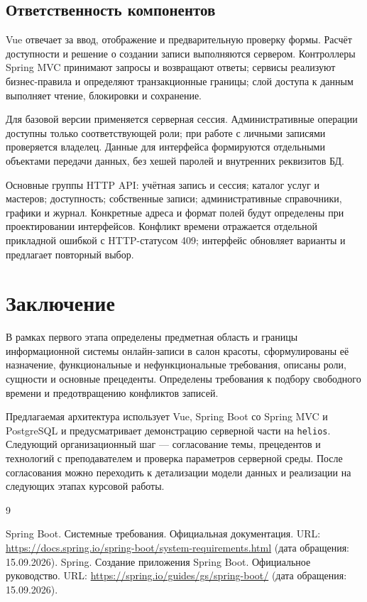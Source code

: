 \subsection{Ответственность компонентов}
Vue отвечает за ввод, отображение и предварительную проверку формы. Расчёт доступности и решение о создании записи выполняются сервером. Контроллеры Spring MVC принимают запросы и возвращают ответы; сервисы реализуют бизнес-правила и определяют транзакционные границы; слой доступа к данным выполняет чтение, блокировки и сохранение.

Для базовой версии применяется серверная сессия. Административные операции доступны только соответствующей роли; при работе с личными записями проверяется владелец. Данные для интерфейса формируются отдельными объектами передачи данных, без хешей паролей и внутренних реквизитов БД.

Основные группы HTTP API: учётная запись и сессия; каталог услуг и мастеров; доступность; собственные записи; административные справочники, графики и журнал. Конкретные адреса и формат полей будут определены при проектировании интерфейсов. Конфликт времени отражается отдельной прикладной ошибкой с HTTP-статусом 409; интерфейс обновляет варианты и предлагает повторный выбор.

\section{Заключение}
В рамках первого этапа определены предметная область и границы информационной системы онлайн-записи в салон красоты, сформулированы её назначение, функциональные и нефункциональные требования, описаны роли, сущности и основные прецеденты. Определены требования к подбору свободного времени и предотвращению конфликтов записей.

Предлагаемая архитектура использует Vue, Spring Boot со Spring MVC и PostgreSQL и предусматривает демонстрацию серверной части на \texttt{helios}. Следующий организационный шаг --- согласование темы, прецедентов и технологий с преподавателем и проверка параметров серверной среды. После согласования можно переходить к детализации модели данных и реализации на следующих этапах курсовой работы.

\begin{thebibliography}{9}
 Spring Boot. Системные требования. Официальная документация. URL: \url{https://docs.spring.io/spring-boot/system-requirements.html} (дата обращения: 15.09.2026).
 Spring. Создание приложения Spring Boot. Официальное руководство. URL: \url{https://spring.io/guides/gs/spring-boot/} (дата обращения: 15.09.2026).
\end{thebibliography}
